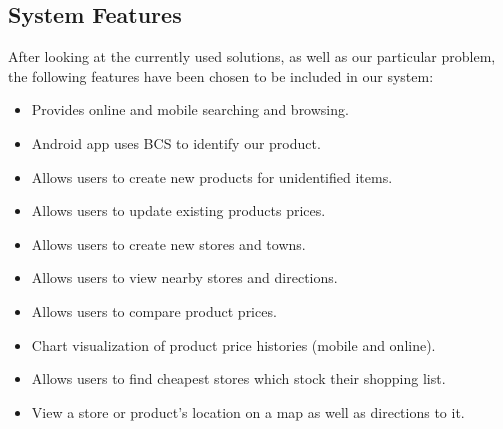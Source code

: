 \subsection{System Features}
After looking at the currently used solutions, as well as our particular problem, the following features have been chosen to be included in our system:
\begin{itemize}
\item Provides online and mobile searching and browsing.
\item Android app uses BCS to identify our product.  
\item Allows users to create new products for unidentified items.
\item Allows users to update existing products prices.
\item Allows users to create new stores and towns.
\item Allows users to view nearby stores and directions.
\item Allows users to compare product prices.
\item Chart visualization of product price histories (mobile and online).
\item Allows users to find cheapest stores which stock their shopping list.
  \item View a store or product's location on a map as well as directions to it.
\end{itemize}
